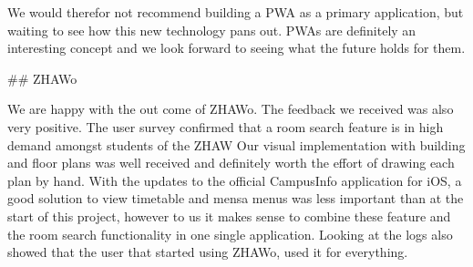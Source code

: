 \begin{markdown}
We would therefor not recommend building a PWA as a primary application, but waiting to see how this new technology pans out. PWAs are definitely an interesting concept and we look forward to seeing what the future holds for them.

## ZHAWo

We are happy with the out come of ZHAWo. The feedback we received was also very positive.
The user survey confirmed that a room search feature is in high demand amongst students of the ZHAW Our visual implementation with building and floor plans was well received and definitely worth the effort of drawing each plan by hand. With the updates to the official CampusInfo application for iOS, a good solution to view timetable and mensa menus was less important than at the start of this project, however to us it makes sense to combine these feature and the room search functionality in one single application. Looking at the logs also showed that the user that started using ZHAWo, used it for everything.

\end{markdown}

